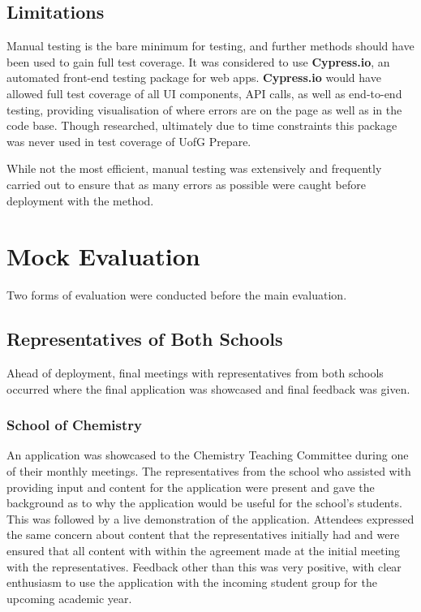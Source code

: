 \documentclass{l4proj}
\begin{document}
\subsection{Limitations}
Manual testing is the bare minimum for testing,  and further methods should have been used to gain full test coverage. It was considered to use \textbf{Cypress.io},  an automated front-end testing package for web apps. \textbf{Cypress.io} would have allowed full test coverage of all UI components,  API calls,  as well as end-to-end testing,  providing visualisation of where errors are on the page as well as in the code base. Though researched,  ultimately due to time constraints this package was never used in test coverage of UofG Prepare.

While not the most efficient,  manual testing was extensively and frequently carried out to ensure that as many errors as possible were caught before deployment with the method.

\section{Mock Evaluation}
Two forms of evaluation were conducted before the main evaluation.

\subsection{Representatives of Both Schools}
Ahead of deployment,  final meetings with representatives from both schools occurred where the final application was showcased and final feedback was given.

\subsubsection{School of Chemistry}
An application was showcased to the Chemistry Teaching Committee during one of their monthly meetings. The representatives from the school who assisted with providing input and content for the application were present and gave the background as to why the application would be useful for the school's students. This was followed by a live demonstration of the application. Attendees expressed the same concern about content that the representatives initially had and were ensured that all content with within the agreement made at the initial meeting with the representatives. Feedback other than this was very positive,  with clear enthusiasm to use the application with the incoming student group for the upcoming academic year.
\end{document}
